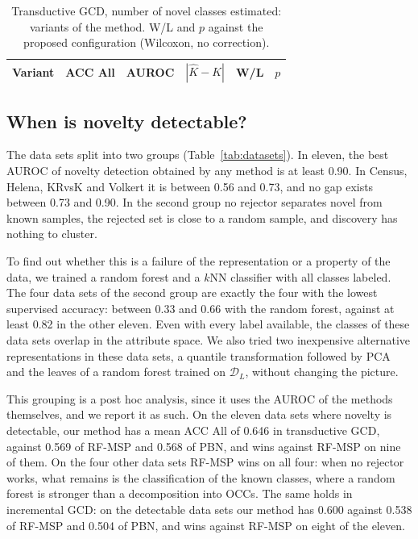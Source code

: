\documentclass[pdflatex,sn-basic]{sn-jnl}
\newcommand{\DL}{\mathcal{D}_L}
\begin{document}
\begin{table}[t]
\caption{Transductive GCD, number of novel classes estimated: variants of the method. W/L and $p$ against the proposed configuration (Wilcoxon, no correction).}\label{tab:ablation}
\centering\footnotesize
\begin{tabular}{@{}lrrrrr@{}}
\toprule
Variant & ACC All & AUROC & $|\hat K - K|$ & W/L & $p$ \\
\midrule

\end{tabular}
\end{table}

\subsection{When is novelty detectable?}\label{sec:detectability}

The data sets split into two groups (Table~\ref{tab:datasets}). In eleven, the best AUROC of novelty detection obtained by any method is at least 0.90. In Census, Helena, KRvsK and Volkert it is between 0.56 and 0.73, and no gap exists between 0.73 and 0.90. In the second group no rejector separates novel from known samples, the rejected set is close to a random sample, and discovery has nothing to cluster.

To find out whether this is a failure of the representation or a property of the data, we trained a random forest and a $k$NN classifier with all classes labeled. The four data sets of the second group are exactly the four with the lowest supervised accuracy: between 0.33 and 0.66 with the random forest, against at least 0.82 in the other eleven. Even with every label available, the classes of these data sets overlap in the attribute space. We also tried two inexpensive alternative representations in these data sets, a quantile transformation followed by PCA and the leaves of a random forest trained on $\DL$, without changing the picture.

This grouping is a post hoc analysis, since it uses the AUROC of the methods themselves, and we report it as such. On the eleven data sets where novelty is detectable, our method has a mean ACC All of 0.646 in transductive GCD, against 0.569 of RF-MSP and 0.568 of PBN, and wins against RF-MSP on nine of them. On the four other data sets RF-MSP wins on all four: when no rejector works, what remains is the classification of the known classes, where a random forest is stronger than a decomposition into OCCs. The same holds in incremental GCD: on the detectable data sets our method has 0.600 against 0.538 of RF-MSP and 0.504 of PBN, and wins against RF-MSP on eight of the eleven.
\end{document}

